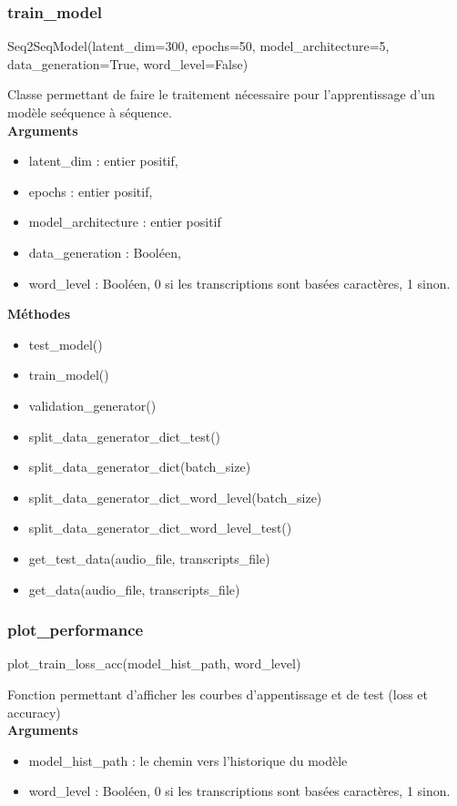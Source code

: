     \subsubsection{train\_model}
    \begin{tcolorbox}
    Seq2SeqModel(latent\_dim=300, epochs=50, model\_architecture=5, data\_generation=True, word\_level=False)
    \end{tcolorbox}
    Classe permettant de faire le traitement nécessaire pour l'apprentissage d'un modèle seéquence à séquence.\\
    \textbf{Arguments}
    \begin{itemize}
        \item latent\_dim : entier positif, 
        \item epochs : entier positif, 
        \item model\_architecture : entier positif
        \item data\_generation : Booléen, 
        \item word\_level : Booléen, 0 si les transcriptions sont basées caractères, 1 sinon.
    \end{itemize}
    \textbf{Méthodes}
    \begin{itemize}
        \item test\_model()
        \item train\_model()
        \item validation\_generator()
        \item split\_data\_generator\_dict\_test()
        \item split\_data\_generator\_dict(batch\_size)
        \item split\_data\_generator\_dict\_word\_level(batch\_size)
        \item split\_data\_generator\_dict\_word\_level\_test()
        \item get\_test\_data(audio\_file, transcripts\_file)
        \item get\_data(audio\_file, transcripts\_file)
    \end{itemize}
    
    
    \subsubsection{plot\_performance}
    \begin{tcolorbox}
    plot\_train\_loss\_acc(model\_hist\_path, word\_level)
    \end{tcolorbox}
    Fonction permettant d'afficher les courbes d'appentissage et de test (loss et accuracy) \\
    \textbf{Arguments} 
    \begin{itemize}
        \item model\_hist\_path : le chemin vers l'historique du modèle
        \item word\_level : Booléen, 0 si les transcriptions sont basées caractères, 1 sinon.
    \end{itemize}

